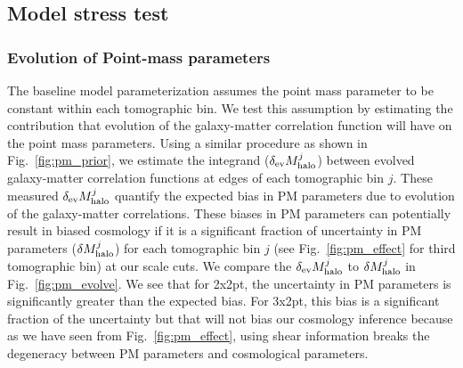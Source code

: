 \documentclass[fleqn,usenatbib]{mnras}
\begin{document}
\subsection{Model stress test}
\subsubsection{Evolution of Point-mass parameters}
The baseline model parameterization assumes the point mass parameter to be constant within each tomographic bin. We test this assumption by estimating the contribution that evolution of the galaxy-matter correlation function will have on the point mass parameters. Using a similar procedure as shown in Fig.~\ref{fig:pm_prior}, we estimate the integrand ($\delta_{\rm ev} M^{j}_{\rm halo}$) between evolved galaxy-matter correlation functions at edges of each tomographic bin $j$. These measured $\delta_{\rm ev} M^{j}_{\rm halo}$ quantify the expected bias in PM parameters due to evolution of the galaxy-matter correlations. These biases in PM parameters can potentially result in biased cosmology if it is a significant fraction of uncertainty in PM parameters ($\delta M^{j}_{\rm halo}$) for each tomographic bin $j$ (see Fig.~\ref{fig:pm_effect} for third tomographic bin) at our scale cuts. We compare the $\delta_{\rm ev} M^{j}_{\rm halo}$ to $\delta M^{j}_{\rm halo}$ in Fig.~\ref{fig:pm_evolve}. We see that for 2x2pt, the uncertainty in PM parameters is significantly greater than the expected bias. For 3x2pt, this bias is a significant fraction of the uncertainty but that will not bias our cosmology inference because as we have seen from Fig.~\ref{fig:pm_effect}, using shear information breaks the degeneracy between PM parameters and cosmological parameters.
\end{document}
